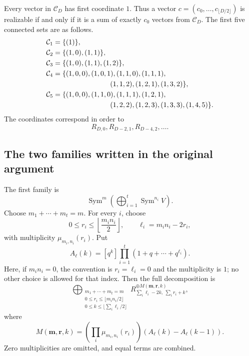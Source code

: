 \documentclass[11pt,reqno]{amsart}
\theoremstyle{definition}
\theoremstyle{remark}
\newcommand{\Sym}{\operatorname{Sym}}
\begin{document}
Every vector in $\mathcal C_D$ has first coordinate $1$.  Thus a vector
$c=(c_0,\ldots,c_{\lfloor D/2\rfloor})$ is realizable if and only if it is a
sum of exactly $c_0$ vectors from $\mathcal C_D$.  The first five connected
sets are as follows.
\begin{align*}
 \mathcal C_1={}&\{(1)\},\\
 \mathcal C_2={}&\{(1,0),(1,1)\},\\
 \mathcal C_3={}&\{(1,0),(1,1),(1,2)\},\\
 \mathcal C_4={}&\{(1,0,0),(1,0,1),(1,1,0),(1,1,1),\\
 &\hspace{24mm}(1,1,2),(1,2,1),(1,3,2)\},\\
 \mathcal C_5={}&\{(1,0,0),(1,1,0),(1,1,1),(1,2,1),\\
 &\hspace{24mm}(1,2,2),(1,2,3),(1,3,3),(1,4,5)\}.
\end{align*}
The coordinates correspond in order to
\begin{equation*}
 R_{D,0},R_{D-2,1},R_{D-4,2},\ldots.
\end{equation*}

\subsection{The two families written in the original argument}

The first family is
\begin{equation*}
 \Sym^m\left(\bigoplus_{i=1}^{t}\Sym^{n_i}V\right).
\end{equation*}
Choose $m_1+\cdots+m_t=m$.  For every $i$, choose
\begin{equation*}
 0\leq r_i\leq\left\lfloor\frac{m_in_i}{2}\right\rfloor,
 \qquad
 \ell_i=m_in_i-2r_i,
\end{equation*}
with multiplicity $\mu_{m_i,n_i}(r_i)$.  Put
\begin{equation*}
 A_{\boldsymbol\ell}(k)
 =[q^k]\prod_{i=1}^{t}(1+q+\cdots+q^{\ell_i}).
\end{equation*}
Here, if $m_in_i=0$, the convention is $r_i=\ell_i=0$ and the multiplicity
is $1$; no other choice is allowed for that index.
Then the full decomposition is
\begin{equation}\label{eq:first-original-family}
 \bigoplus_{\substack{m_1+\cdots+m_t=m\\
 0\leq r_i\leq\lfloor m_in_i/2\rfloor\\
 0\leq k\leq\lfloor\sum_i\ell_i/2\rfloor}}
 R_{\sum_i\ell_i-2k,\ \sum_i r_i+k}^{\oplus M(\boldsymbol m,\boldsymbol r,k)},
\end{equation}
where
\begin{equation}\label{eq:first-family-mult}
 M(\boldsymbol m,\boldsymbol r,k)
 =
 \left(\prod_i\mu_{m_i,n_i}(r_i)\right)
 \left(A_{\boldsymbol\ell}(k)-A_{\boldsymbol\ell}(k-1)\right).
\end{equation}
Zero multiplicities are omitted, and equal terms are combined.
\end{document}
